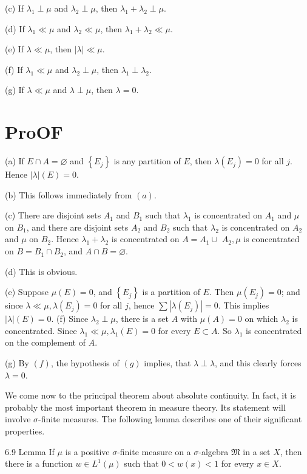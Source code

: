 \documentclass[10pt]{article}
\begin{document}
(c) If $\lambda_{1} \perp \mu$ and $\lambda_{2} \perp \mu$, then $\lambda_{1}+\lambda_{2} \perp \mu$.

(d) If $\lambda_{1} \ll \mu$ and $\lambda_{2} \ll \mu$, then $\lambda_{1}+\lambda_{2} \ll \mu$.

(e) If $\lambda \ll \mu$, then $|\lambda| \ll \mu$.

(f) If $\lambda_{1} \ll \mu$ and $\lambda_{2} \perp \mu$, then $\lambda_{1} \perp \lambda_{2}$.

(g) If $\lambda \ll \mu$ and $\lambda \perp \mu$, then $\lambda=0$.

\section{ProOF}
(a) If $E \cap A=\varnothing$ and $\left\{E_{j}\right\}$ is any partition of $E$, then $\lambda\left(E_{j}\right)=0$ for all $j$. Hence $|\lambda|(E)=0$.

(b) This follows immediately from $(a)$.

(c) There are disjoint sets $A_{1}$ and $B_{1}$ such that $\lambda_{1}$ is concentrated on $A_{1}$ and $\mu$ on $B_{1}$, and there are disjoint sets $A_{2}$ and $B_{2}$ such that $\lambda_{2}$ is concentrated on $A_{2}$ and $\mu$ on $B_{2}$. Hence $\lambda_{1}+\lambda_{2}$ is concentrated on $A=A_{1} \cup$ $A_{2}, \mu$ is concentrated on $B=B_{1} \cap B_{2}$, and $A \cap B=\varnothing$.

(d) This is obvious.

(e) Suppose $\mu(E)=0$, and $\left\{E_{j}\right\}$ is a partition of $E$. Then $\mu\left(E_{j}\right)=0$; and since $\lambda \ll \mu, \lambda\left(E_{j}\right)=0$ for all $j$, hence $\sum\left|\lambda\left(E_{j}\right)\right|=0$. This implies $|\lambda|(E)=0$.
(f) Since $\lambda_{2} \perp \mu$, there is a set $A$ with $\mu(A)=0$ on which $\lambda_{2}$ is concentrated. Since $\lambda_{1} \ll \mu, \lambda_{1}(E)=0$ for every $E \subset A$. So $\lambda_{1}$ is concentrated on the complement of $A$.

(g) By $(f)$, the hypothesis of $(g)$ implies, that $\lambda \perp \lambda$, and this clearly forces $\lambda=0$.

We come now to the principal theorem about absolute continuity. In fact, it is probably the most important theorem in measure theory. Its statement will involve $\sigma$-finite measures. The following lemma describes one of their significant properties.

6.9 Lemma If $\mu$ is a positive $\sigma$-finite measure on a $\sigma$-algebra $\mathfrak{M}$ in a set $X$, then there is a function $w \in L^{1}(\mu)$ such that $0<w(x)<1$ for every $x \in X$.
\end{document}
